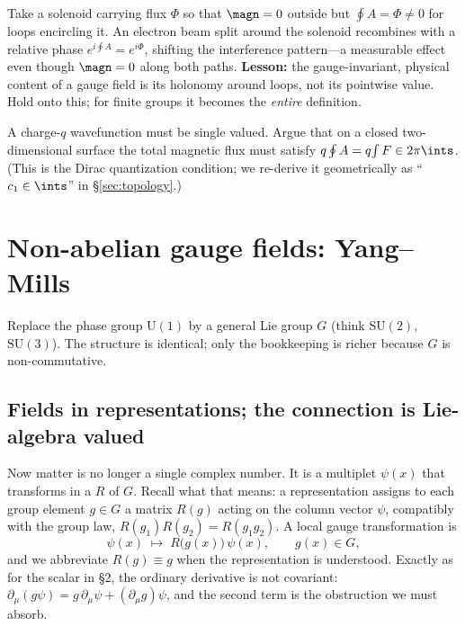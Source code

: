 \documentclass[11pt]{article}
\newcommand{\Uone}{\mathrm{U}(1)}
\begin{document}
\begin{eexample}
Take a solenoid carrying flux $\Phi$ so that $\magn=0$ outside but $\oint A = \Phi
\neq 0$ for loops encircling it. An electron beam split around the solenoid recombines
with a relative phase $e^{i\oint A}=e^{i\Phi}$, shifting the interference pattern---a
measurable effect even though $\magn=0$ along both paths. \textbf{Lesson:} the
gauge-invariant, physical content of a gauge field is its holonomy around loops, not
its pointwise value. Hold onto this; for finite groups it becomes the \emph{entire}
definition.
\end{eexample}

\begin{xca}
A charge-$q$ wavefunction must be single valued. Argue that on a closed
two-dimensional surface the total magnetic flux must satisfy
$q\oint A = q\!\int F \in 2\pi\ints$. (This is the Dirac quantization condition; we
re-derive it geometrically as ``$c_1 \in \ints$'' in \S\ref{sec:topology}.)
\end{xca}

\section{Non-abelian gauge fields: Yang--Mills}

Replace the phase group $\Uone$ by a general Lie group $G$ (think $\mathrm{SU}(2)$,
$\mathrm{SU}(3)$). The structure is identical; only the bookkeeping is richer because
$G$ is non-commutative.

\subsection{Fields in representations; the connection is Lie-algebra valued}

Now matter is no longer a single complex number. It is a multiplet $\psi(x)$ that
transforms in a  $R$ of $G$. Recall what that means: a
representation assigns to each group element $g\in G$ a matrix $R(g)$ acting on the column
vector $\psi$, compatibly with the group law, $R(g_1)R(g_2)=R(g_1g_2)$. A local gauge
transformation is
\[
\psi(x)\;\longmapsto\;R\big(g(x)\big)\,\psi(x),\qquad g(x)\in G,
\]
and we abbreviate $R(g)\equiv g$ when the representation is understood. Exactly as for the
scalar in \S2, the ordinary derivative is not covariant:
$\partial_\mu(g\psi)=g\,\partial_\mu\psi+(\partial_\mu g)\psi$, and the second term is the
obstruction we must absorb.
\end{document}
